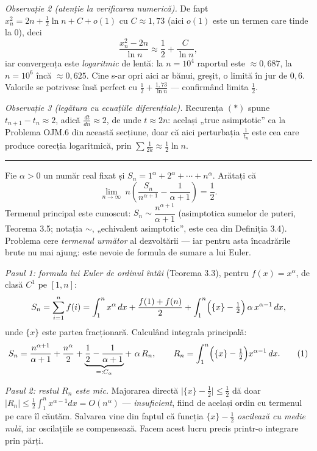 \emph{Observație 2 (atenție la verificarea numerică).} De fapt $x_n^{2}=2n+\frac12\ln n+C+o(1)$ cu $C\approx1{,}73$ (aici $o(1)$ este un termen care tinde la $0$), deci
\[ \frac{x_n^{2}-2n}{\ln n}\approx\frac12+\frac{C}{\ln n} , \]
iar convergența este \emph{logaritmic} de lentă: la $n=10^{4}$ raportul este $\approx0{,}687$, la $n=10^{6}$ încă $\approx0{,}625$. Cine s-ar opri aici ar bănui, greșit, o limită în jur de $0{,}6$. Valorile se potrivesc însă perfect cu $\frac12+\frac{1{,}73}{\ln n}$ --- confirmând limita $\frac12$.

\emph{Observație 3 (legătura cu ecuațiile diferențiale).} Recurența $(\ast)$ spune $t_{n+1}-t_n\approx2$, adică $\frac{dt}{dn}\approx2$, de unde $t\approx2n$: același „truc asimptotic'' ca la Problema OJM.6 din această secțiune, doar că aici perturbația $\frac{1}{t_n}$ este cea care produce corecția logaritmică, prin $\sum\frac{1}{2k}\approx\frac12\ln n$.
\vspace{1mm}\hrule

Fie $\alpha>0$ un număr real fixat și $S_{n}=1^{\alpha}+2^{\alpha}+\cdots+n^{\alpha}$. Arătați că
\[ \lim_{n\to\infty}\ n\left(\frac{S_{n}}{n^{\alpha+1}}-\frac{1}{\alpha+1}\right)=\frac12 . \]
\sol Termenul principal este cunoscut: $S_{n}\sim\dfrac{n^{\alpha+1}}{\alpha+1}$ (asimptotica sumelor de puteri, Teorema 3.5; notația $\sim$, „echivalent asimptotic'', este cea din Definiția 3.4). Problema cere \emph{termenul următor} al dezvoltării --- iar pentru asta încadrările brute nu mai ajung: este nevoie de formula de sumare a lui Euler.

\emph{Pasul 1: formula lui Euler de ordinul întâi} (Teorema 3.3), pentru $f(x)=x^{\alpha}$, de clasă $C^{1}$ pe $[1,n]$:
\[ S_{n}=\sum_{i=1}^{n}f(i)=\int_{1}^{n}x^{\alpha}\,dx+\frac{f(1)+f(n)}{2}+\int_{1}^{n}\Bigl(\{x\}-\tfrac12\Bigr)\,\alpha\,x^{\alpha-1}\,dx , \]
unde $\{x\}$ este partea fracționară. Calculând integrala principală:
\[ S_{n}=\frac{n^{\alpha+1}}{\alpha+1}+\frac{n^{\alpha}}{2}+\underbrace{\frac12-\frac{1}{\alpha+1}}_{=:C_{\alpha}}+\ \alpha\,R_{n},\qquad R_{n}=\int_{1}^{n}\Bigl(\{x\}-\tfrac12\Bigr)x^{\alpha-1}\,dx . \tag{1} \]

\emph{Pasul 2: restul $R_{n}$ este mic.} Majorarea directă $\bigl|\{x\}-\frac12\bigr|\le\frac12$ dă doar $|R_{n}|\le\frac12\int_1^n x^{\alpha-1}dx=O(n^{\alpha})$ --- \emph{insuficient}, fiind de același ordin cu termenul pe care îl căutăm. Salvarea vine din faptul că funcția $\{x\}-\frac12$ \emph{oscilează cu medie nulă}, iar oscilațiile se compensează. Facem acest lucru precis printr-o integrare prin părți.

